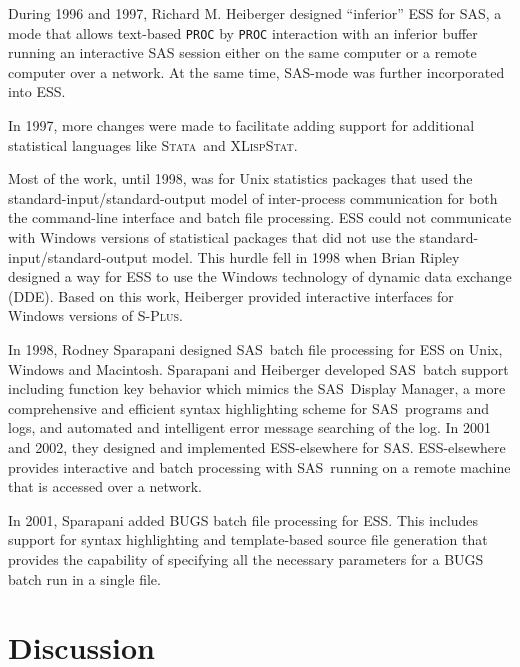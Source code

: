 \documentclass{article}
\newcommand*{\SAS}{\textsc{SAS}}
\newcommand*{\Splus}{\textsc{S-Plus}}
\newcommand*{\XLispStat}{\textsc{XLispStat}}
\newcommand*{\Stata}{\textsc{Stata}}
\newcommand{\stexttt}[1]{{\small\texttt{#1}}}
\begin{document}
During 1996 and 1997, Richard M. Heiberger designed ``inferior'' ESS
for \SAS, a mode that allows text-based \stexttt{PROC} by
\stexttt{PROC} interaction with an inferior buffer running an interactive SAS
session either on the same computer or a remote computer over a network.
At the same time, SAS-mode was further incorporated into ESS.

In 1997, more changes were made to facilitate
adding support for additional statistical languages like \Stata\ and
\XLispStat.

Most of the work, until 1998, was for Unix statistics
packages that used the standard-input/standard-output model of inter-process
communication for both the command-line interface and batch file
processing.  ESS could not communicate
with Windows versions of statistical packages that did not
use the standard-input/standard-output model.  This hurdle
fell in 1998 when Brian Ripley designed a way for ESS to use
the Windows technology of dynamic data exchange (DDE).
Based on this work, Heiberger provided interactive interfaces
for Windows versions of \Splus.

In 1998, Rodney Sparapani designed \SAS\ batch file processing for ESS
on Unix, Windows and Macintosh.
Sparapani and Heiberger developed \SAS\ batch support including function
key behavior which mimics the \SAS\ Display Manager,
a more comprehensive and efficient syntax highlighting scheme for \SAS\
programs and logs, and automated and intelligent error message searching
of the log.  In 2001 and 2002, they designed and implemented ESS-elsewhere
for \SAS.  ESS-elsewhere provides interactive and batch processing
with \SAS\ running on a remote machine that is accessed over a
network.

In 2001, Sparapani added BUGS batch file processing for ESS.  This
includes support for syntax highlighting and template-based source file
generation that provides the capability of specifying all the necessary
parameters for a BUGS batch run in a single file.

\section{Discussion}
\label{sec:discussion}
\end{document}

